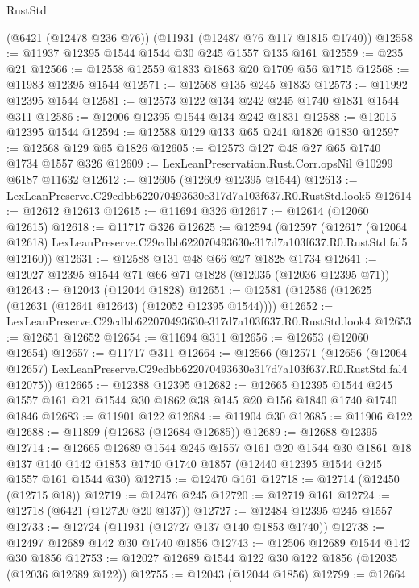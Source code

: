 \begin{lexlean}{RustStd}
\begin{coremodule}
    (@6421 (@12478 @236 @76))
    (@11931 (@12487 @76 @117 @1815 @1740))
@12558 := @11937 @12395 @1544 @1544 @30 @245 @1557 @135 @161
@12559 := @235 @21
@12566 := @12558 @12559 @1833 @1863 @20 @1709 @56 @1715
@12568 := @11983 @12395 @1544
@12571 := @12568 @135 @245 @1833
@12573 := @11992 @12395 @1544
@12581 := @12573 @122 @134 @242 @245 @1740 @1831 @1544 @311
@12586 := @12006 @12395 @1544 @134 @242 @1831
@12588 := @12015 @12395 @1544
@12594 := @12588 @129 @133 @65 @241 @1826 @1830
@12597 := @12568 @129 @65 @1826
@12605 := @12573 @127 @48 @27 @65 @1740 @1734 @1557 @326
@12609 := LexLeanPreservation.Rust.Corr.opsNil @10299 @6187 @11632
@12612 := @12605 (@12609 @12395 @1544)
@12613 := LexLeanPreserve.C29cdbb622070493630e317d7a103f637.R0.RustStd.look5
@12614 := @12612 @12613
@12615 := @11694 @326
@12617 := @12614 (@12060 @12615)
@12618 := @11717 @326
@12625 := @12594
    (@12597
      (@12617
        (@12064 @12618)
        LexLeanPreserve.C29cdbb622070493630e317d7a103f637.R0.RustStd.fal5
        @12160))
@12631 := @12588 @131 @48 @66 @27 @1828 @1734
@12641 := @12027 @12395 @1544 @71 @66 @71 @1828 (@12035 (@12036 @12395 @71))
@12643 := @12043 (@12044 @1828)
@12651 := @12581 (@12586 (@12625 (@12631 (@12641 @12643) (@12052 @12395 @1544))))
@12652 := LexLeanPreserve.C29cdbb622070493630e317d7a103f637.R0.RustStd.look4
@12653 := @12651 @12652
@12654 := @11694 @311
@12656 := @12653 (@12060 @12654)
@12657 := @11717 @311
@12664 := @12566
    (@12571
      (@12656
        (@12064 @12657)
        LexLeanPreserve.C29cdbb622070493630e317d7a103f637.R0.RustStd.fal4
        @12075))
@12665 := @12388 @12395
@12682 := @12665
    @12395
    @1544
    @245
    @1557
    @161
    @21
    @1544
    @30
    @1862
    @38
    @145
    @20
    @156
    @1840
    @1740
    @1740
    @1846
@12683 := @11901 @122
@12684 := @11904 @30
@12685 := @11906 @122
@12688 := @11899 (@12683 (@12684 @12685))
@12689 := @12688 @12395
@12714 := @12665
    @12689
    @1544
    @245
    @1557
    @161
    @20
    @1544
    @30
    @1861
    @18
    @137
    @140
    @142
    @1853
    @1740
    @1740
    @1857
    (@12440 @12395 @1544 @245 @1557 @161 @1544 @30)
@12715 := @12470 @161
@12718 := @12714 (@12450 (@12715 @18))
@12719 := @12476 @245
@12720 := @12719 @161
@12724 := @12718 (@6421 (@12720 @20 @137))
@12727 := @12484 @12395 @245 @1557
@12733 := @12724 (@11931 (@12727 @137 @140 @1853 @1740))
@12738 := @12497 @12689 @142 @30 @1740 @1856
@12743 := @12506 @12689 @1544 @142 @30 @1856
@12753 := @12027 @12689 @1544 @122 @30 @122 @1856 (@12035 (@12036 @12689 @122))
@12755 := @12043 (@12044 @1856)
@12799 := @12664

\end{coremodule}
\end{lexlean}
